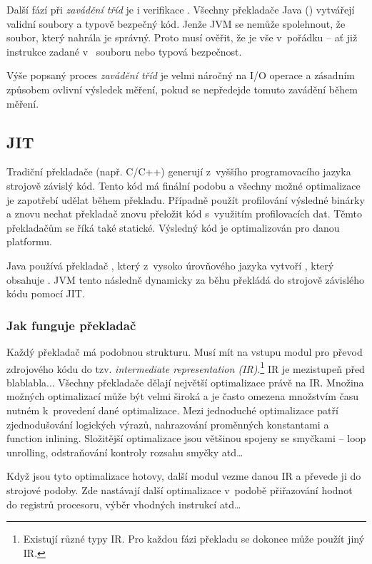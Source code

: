 Další fází při \emph{zavádění tříd} je i verifikace \bytecode{}. Všechny překladače Java (\javac{}) vytvářejí validní \classfile{} soubory a typově bezpečný kód. Jenže JVM se nemůže spolehnout, že soubor, který nahrála je správný. Proto musí ověřit, že je vše v~pořádku -- ať již instrukce zadané v~\classfile{} souboru nebo typová bezpečnost.

Výše popsaný proces \emph{zavádění tříd} je velmi náročný na I/O operace a zásadním způsobem ovlivní výsledek měření, pokud se nepředejde tomuto zavádění během měření.

\subsection{JIT\label{sub:JIT}}
Tradiční překladače (např. C/C++) generují z~vyššího programovacího jazyka strojově závislý kód. Tento kód má finální podobu a všechny možné optimalizace je zapotřebí udělat během překladu. Případně použít profilování výsledné binárky a znovu nechat překladač znovu přeložit kód s~využitím profilovacích dat. Těmto překladačům se říká také statické. Výsledný kód je optimalizován pro danou platformu.

Java používá překladač \javac{}, který z~vysoko úrovňového jazyka vytvoří \classfile{}, který obsahuje \bytecode{}. JVM tento \bytecode{} následně dynamicky za běhu překládá do strojově závislého kódu pomocí JIT.

\subsubsection{Jak funguje překladač}
Každý překladač má podobnou strukturu. Musí mít na vstupu modul pro převod zdrojového kódu do tzv. \emph{intermediate representation (IR)}.\footnote{Existují různé typy IR. Pro každou fázi překladu se dokonce může použít jiný IR.} IR je mezistupeň před blablabla... Všechny překladače dělají největší optimalizace právě na IR. Množina možných optimalizací může být velmi široká a je často omezena množstvím času nutném k~provedení dané optimalizace. Mezi jednoduché optimalizace patří zjednodušování logických výrazů, nahrazování proměnných konstantami a function inlining. Složitější optimalizace jsou většinou spojeny se smyčkami -- loop unrolling, odstraňování kontroly rozsahu smyčky atd\ldots{}

Když jsou tyto optimalizace hotovy, další modul vezme danou IR a převede ji do strojové podoby. Zde nastávají další optimalizace v~podobě přiřazování hodnot do registrů procesoru, výběr vhodných instrukcí atd\ldots{}

